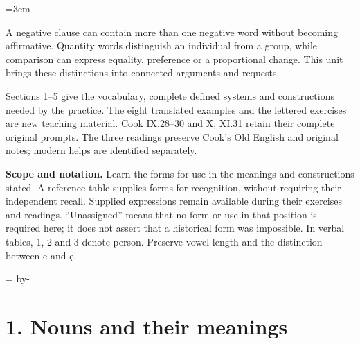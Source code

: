 \newcommand{\runningtitle}{Unit 15. Negation and quantity}

\emergencystretch=3em
\newcommand{\itempara}[2]{\par\addvspace{3pt}\noindent\hangindent=1.8em\hangafter=1\makebox[1.8em][l]{#1.}#2\par}
\newcommand{\reserve}[1]{\par\penalty-100\begingroup\dimen0=\pagegoal\advance\dimen0 by-\pagetotal\ifdim\dimen0<#1\newpage\fi\endgroup}

\raggedright
{}

A negative clause can contain more than one negative word without becoming affirmative. Quantity words distinguish an individual from a group, while comparison can express equality, preference or a proportional change. This unit brings these distinctions into connected arguments and requests.

Sections 1–5 give the vocabulary, complete defined systems and constructions needed by the practice. The eight translated examples and the lettered exercises are new teaching material. Cook IX.28–30 and X, XI.31 retain their complete original prompts. The three readings preserve Cook’s Old English and original notes; modern helps are identified separately.

\textbf{Scope and notation.} Learn the forms for use in the meanings and constructions stated. A reference table supplies forms for recognition, without requiring their independent recall. Supplied expressions remain available during their exercises and readings. “Unassigned” means that no form or use in that position is required here; it does not assert that a historical form was impossible. In verbal tables, 1, 2 and 3 denote person. Preserve vowel length and the distinction between e and ę.

\reserve{7\baselineskip}
\section*{1. Nouns and their meanings}


